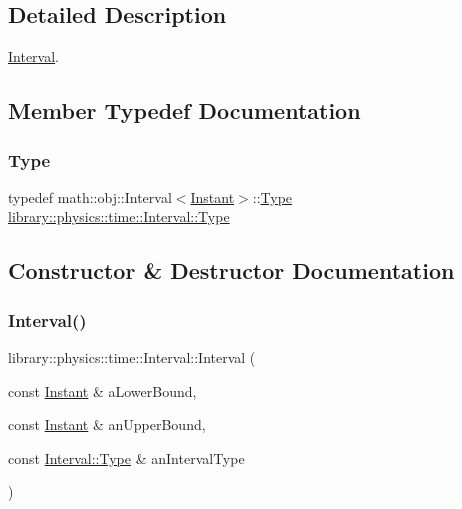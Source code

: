 \subsection{Detailed Description}
\hyperlink{classlibrary_1_1physics_1_1time_1_1_interval}{Interval}. 

\subsection{Member Typedef Documentation}
\mbox{\label{classlibrary_1_1physics_1_1time_1_1_interval_aba490e7120a05be7b17a4d8076f25d48}} 
\subsubsection{\texorpdfstring{Type}{Type}}
{\footnotesize\ttfamily typedef math\+::obj\+::\+Interval$<$\hyperlink{classlibrary_1_1physics_1_1time_1_1_instant}{Instant}$>$\+::\hyperlink{classlibrary_1_1physics_1_1time_1_1_interval_aba490e7120a05be7b17a4d8076f25d48}{Type} \hyperlink{classlibrary_1_1physics_1_1time_1_1_interval_aba490e7120a05be7b17a4d8076f25d48}{library\+::physics\+::time\+::\+Interval\+::\+Type}}



\subsection{Constructor \& Destructor Documentation}
\mbox{\label{classlibrary_1_1physics_1_1time_1_1_interval_a49747b0d5f97a92d17f933a23b636156}} 
\subsubsection{\texorpdfstring{Interval()}{Interval()}}
{\footnotesize\ttfamily library\+::physics\+::time\+::\+Interval\+::\+Interval (\begin{DoxyParamCaption}\item[{const \hyperlink{classlibrary_1_1physics_1_1time_1_1_instant}{Instant} \&}]{a\+Lower\+Bound,  }\item[{const \hyperlink{classlibrary_1_1physics_1_1time_1_1_instant}{Instant} \&}]{an\+Upper\+Bound,  }\item[{const \hyperlink{classlibrary_1_1physics_1_1time_1_1_interval_aba490e7120a05be7b17a4d8076f25d48}{Interval\+::\+Type} \&}]{an\+Interval\+Type }\end{DoxyParamCaption})}



